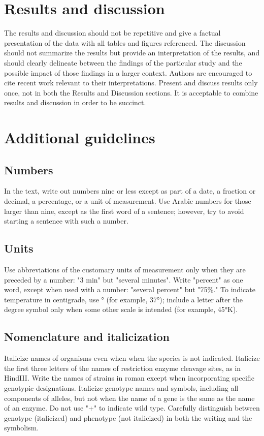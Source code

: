 \documentclass[10pt,twocolumn,twoside,lineno]{gsajnl}
\begin{document}
\section{Results and discussion}

The results and discussion should not be repetitive and give a factual presentation of the data with all tables and figures referenced. The discussion should not summarize the results but provide an interpretation of the results, and should clearly delineate between the findings of the particular study and the possible impact of those findings in a larger context. Authors are encouraged to cite recent work relevant to their interpretations. Present and discuss results only once, not in both the Results and Discussion sections. It is acceptable to combine results and discussion in order to be succinct.

\section{Additional guidelines}

\subsection{Numbers} In the text, write out numbers nine or less except as part of a date, a fraction or decimal, a percentage, or a unit of measurement. Use Arabic numbers for those larger than nine, except as the first word of a sentence; however, try to avoid starting a sentence with such a number.

\subsection{Units} Use abbreviations of the customary units of measurement only when they are preceded by a number: "3 min" but "several minutes". Write "percent" as one word, except when used with a number: "several percent" but "75\%." To indicate temperature in centigrade, use ° (for example, 37°); include a letter after the degree symbol only when some other scale is intended (for example, 45°K).

\subsection{Nomenclature and italicization} Italicize names of organisms even when  when the species is not indicated.  Italicize the first three letters of the names of restriction enzyme cleavage sites, as in HindIII. Write the names of strains in roman except when incorporating specific genotypic designations. Italicize genotype names and symbols, including all components of alleles, but not when the name of a gene is the same as the name of an enzyme. Do not use "+" to indicate wild type. Carefully distinguish between genotype (italicized) and phenotype (not italicized) in both the writing and the symbolism.
\end{document}
